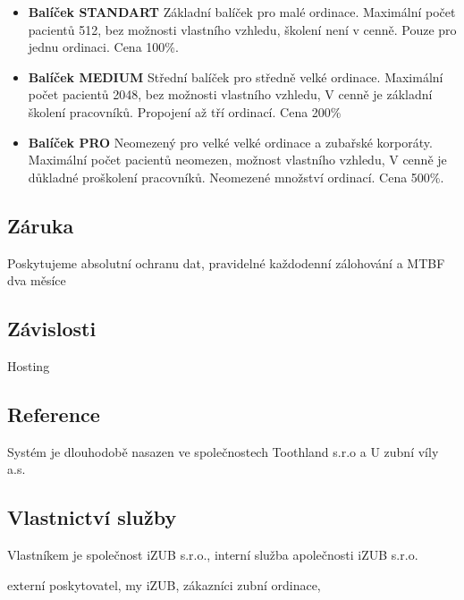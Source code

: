 \documentclass[12pt, a4paper, titlepage]{article}
\begin{document}
	\newpage

	\noindent\makebox[\linewidth]{\rule{16cm}{0.4pt}}

	\begin{itemize}

		

		\item \textbf{Balíček STANDART} Základní balíček pro malé ordinace. Maximální počet pacientů 512, bez možnosti vlastního vzhledu, školení není v cenně. Pouze pro jednu ordinaci. Cena 100\%.

		\item \textbf{Balíček MEDIUM} Střední balíček pro středně velké ordinace. Maximální počet pacientů 2048, bez možnosti vlastního vzhledu, V cenně je základní školení pracovníků. Propojení až tří ordinací. Cena 200\%

		\item \textbf{Balíček PRO} Neomezený pro velké velké ordinace a zubařské korporáty. Maximální počet pacientů neomezen, možnost vlastního vzhledu, V cenně je důkladné proškolení pracovníků. Neomezené množství ordinací. Cena 500\%.
	\end{itemize}

	\subsection*{Záruka}

	Poskytujeme absolutní ochranu dat, pravidelné každodenní zálohování a MTBF dva měsíce

	\subsection*{Závislosti}

	Hosting

	\subsection*{Reference}
	Systém je dlouhodobě nasazen ve společnostech Toothland s.r.o a U zubní víly a.s.

	\subsection*{Vlastnictví služby}

	Vlastníkem je společnost iZUB s.r.o., interní služba apolečnosti iZUB s.r.o.

	externí poskytovatel,
	my iZUB, zákazníci zubní ordinace,
\end{document}
